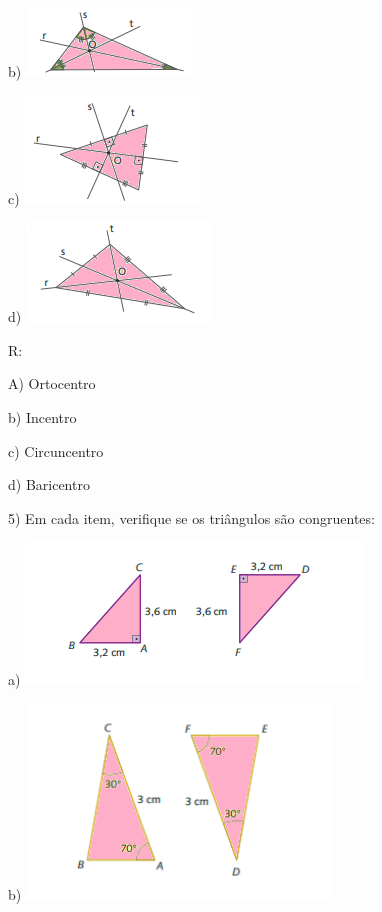 b)
\includegraphics[width=1.72917in,height=0.71875in]{./imgSAEB_8_MAT/media/image16.png}

c)
\includegraphics[width=1.84375in,height=1.125in]{./imgSAEB_8_MAT/media/image17.png}

d)
\includegraphics[width=1.9375in,height=1.04167in]{./imgSAEB_8_MAT/media/image18.png}

R:

A) Ortocentro

b) Incentro

c) Circuncentro

d) Baricentro

5) Em cada item, verifique se os triângulos são congruentes:

a)
\includegraphics[width=3.51042in,height=1.48958in]{./imgSAEB_8_MAT/media/image19.png}

b)
\includegraphics[width=3.16667in,height=2.03958in]{./imgSAEB_8_MAT/media/image20.png}

